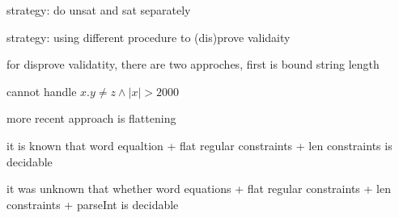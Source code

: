 strategy: do unsat and sat separately

strategy: using different procedure to (dis)prove validaity

for disprove validatity, there are two approches, first is bound string length

cannot handle $x.y \neq z  \wedge |x| > 2000$

more recent approach is flattening

it is known that word equaltion + flat regular constraints + len constraints
is decidable

it was unknown that whether word equations + flat regular constraints + len constraints + parseInt is decidable

